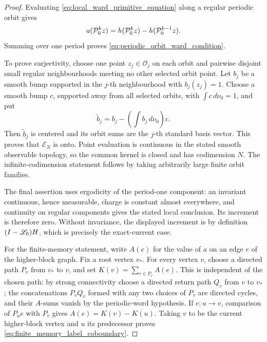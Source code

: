 \begin{proof}
Evaluating \eqref{eq:local_ward_primitive_equation} along a regular periodic
orbit gives
\[
 a(\mathcal P_0^kz)=h(\mathcal P_0^kz)-h(\mathcal P_0^{k-1}z).
\]
Summing over one period proves \eqref{eq:periodic_orbit_ward_condition}.

To prove surjectivity, choose one point \(z_j\in\mathcal O_j\) on each orbit
and pairwise disjoint small regular neighbourhoods meeting no other selected
orbit point.  Let \(b_j\) be a smooth bump supported in the \(j\)-th
neighbourhood with \(b_j(z_j)=1\).  Choose a smooth bump \(c\), supported away
from all selected orbits, with \(\int c\,d\nu_0=1\), and put
\[
 \widetilde b_j=b_j-\left(\int b_j\,d\nu_0\right)c.
\]
Then \(\widetilde b_j\) is centered and its orbit sums are the \(j\)-th
standard basis vector.  This proves that \(\mathcal E_N\) is onto.  Point
evaluation is continuous in the stated smooth observable topology, so the
common kernel is closed and has codimension \(N\).  The infinite-codimension
statement follows by taking arbitrarily large finite orbit families.

The final assertion uses ergodicity of the period-one component: an invariant
continuous, hence measurable, charge is constant almost everywhere, and
continuity on regular components gives the stated local conclusion.  Its
increment is therefore zero.  Without invariance, the displayed increment is
by definition \((I-\mathscr L_0)H\), which is precisely the exact-current
case.

For the finite-memory statement, write \(A(e)\) for the value of \(a\) on an
edge \(e\) of the higher-block graph.  Fix a root vertex \(v_*\).  For every
vertex \(v\), choose a directed path \(P_v\) from \(v_*\) to \(v\), and set
\(K(v)=\sum_{e\in P_v}A(e)\).  This is independent of the chosen path: by
strong connectivity choose a directed return path \(Q_v\) from \(v\) to
\(v_*\); the concatenations \(P_vQ_v\) formed with any two choices of
\(P_v\) are directed cycles, and their \(A\)-sums vanish by the periodic-word
hypothesis.  If \(e:u\to v\), comparison of \(P_u e\) with \(P_v\) gives
\(A(e)=K(v)-K(u)\).  Taking \(v\) to be the current higher-block vertex and
\(u\) its predecessor proves \eqref{eq:finite_memory_label_coboundary}.
\end{proof}

